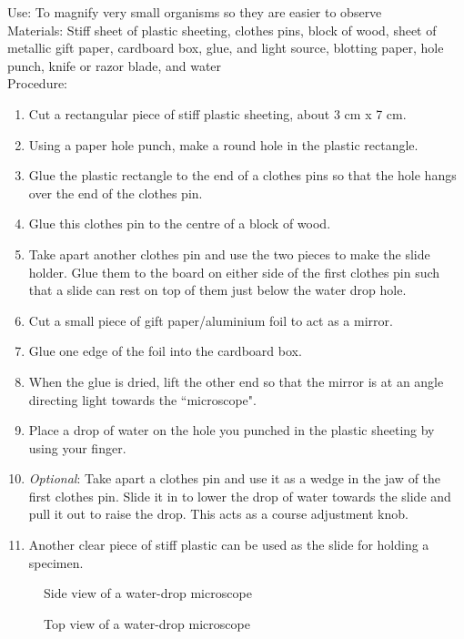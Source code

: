 Use: To magnify very small organisms so they are easier to observe\\
Materials: Stiff sheet of plastic sheeting, clothes pins, block of wood, sheet of metallic gift paper, cardboard box, glue, and light source, blotting paper, hole punch, knife or razor blade, and water\\
Procedure: 
\begin{enumerate} 
\item Cut a rectangular piece of stiff plastic sheeting, about 3 cm x 7 cm.
\item Using a paper hole punch, make a round hole in the plastic rectangle. 
\item Glue the plastic rectangle to the end of a clothes pins so that the hole hangs over the end of the clothes pin.
\item Glue this clothes pin to the centre of a block of wood.
\item Take apart another clothes pin and use the two pieces to make the slide holder. Glue them to the board on either side of the first clothes pin such that a slide can rest on top of them just below the water drop hole.
\item Cut a small piece of gift paper/aluminium foil to act as a mirror.
\item Glue one edge of the foil into the cardboard box.
\item When the glue is dried, lift the other end so that the mirror is at an angle directing light towards the ``microscope".
\item Place a drop of water on the hole you punched in the plastic sheeting by using your finger.
\item \textit{Optional}: Take apart a clothes pin and use it as a wedge in the jaw of the first clothes pin. Slide it in to lower the drop of water towards the slide and pull it out to raise the drop. This acts as a course adjustment knob.
\item Another clear piece of stiff plastic can be used as the slide for holding a specimen.
\end{enumerate}

\begin{figure}[H]
\begin{center}
\def\svgwidth{350pt}

\caption{Side view of a water-drop microscope}
\label{fig:microscope-side}
\end{center}
\end{figure}

\begin{figure}[H]
\begin{center}
\def\svgwidth{350pt}

\caption{Top view of a water-drop microscope}
\label{fig:microscope-top}
\end{center}
\end{figure}
